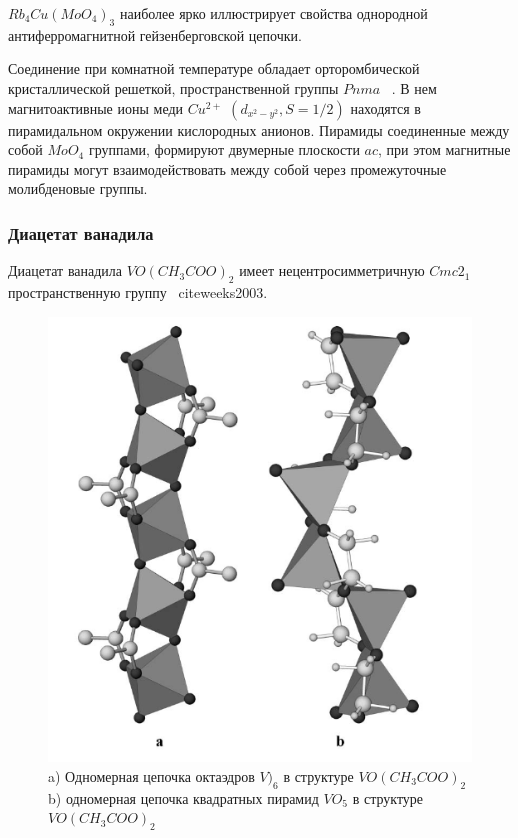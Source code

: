 \documentclass[11pt]{article}
\begin{document}
$Rb_4Cu(MoO_4)_3$ наиболее ярко иллюстрирует свойства однородной антиферромагнитной гейзенберговской цепочки. 

Соединение при комнатной температуре обладает орторомбической кристаллической решеткой, пространственной группы $Pnma$ ~\cite{ishii2010}. В нем магнитоактивные ионы меди $Cu^{2+}$ $(d_{x^2-y^2}, S=1/2)$ находятся в пирамидальном окружении кислородных анионов. Пирамиды соединенные между собой $MoO_4$ группами, формируют двумерные плоскости $ac$, при этом магнитные пирамиды могут взаимодействовать между собой через промежуточные молибденовые группы. 

\subsubsection{Диацетат ванадила}
Диацетат ванадила $VO(CH_3COO)_2$ имеет нецентросимметричную $Cmc2_1$ пространственную группу ~cite{weeks2003}.

\begin{figure}[htp]
\centering
\includegraphics[scale=0.55]{VOCH3COO}
\caption{a) Одномерная цепочка октаэдров $V)_6$ в структуре $VO(CH_3COO)_2$ b) одномерная цепочка квадратных пирамид $VO_5$ в структуре $VO(CH_3COO)_2$ ~\cite{weeks2003}}
\label{}
\end{figure}
\end{document}
